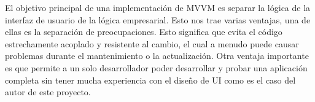 %
El objetivo principal de una implementación de MVVM es separar la lógica de la interfaz de usuario de la lógica empresarial. Esto nos trae varias ventajas, una de ellas es la separación de preocupaciones. Esto significa que evita el código estrechamente acoplado y resistente al cambio, el cual a menudo puede causar problemas durante el mantenimiento o la actualización. Otra ventaja importante es que permite a un solo desarrollador poder desarrollar y probar una aplicación completa sin tener mucha experiencia con el diseño de UI como es el caso del autor de este proyecto.
%
%
%
%
%
%

